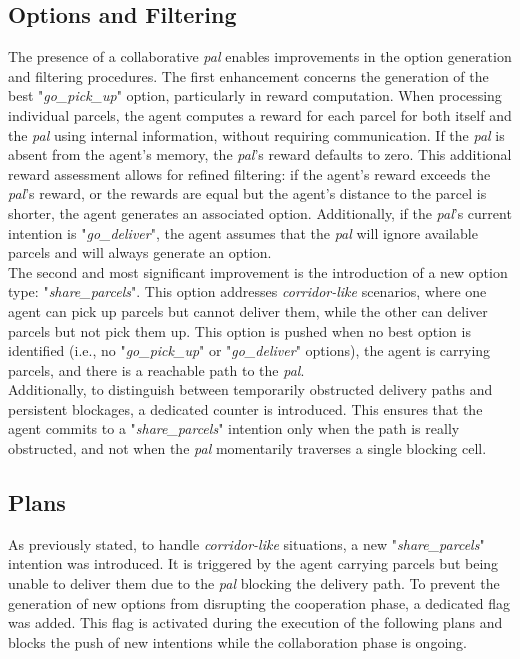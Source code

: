     \subsection{Options and Filtering}
        The presence of a collaborative \textit{pal} enables improvements in the option generation and filtering procedures. The first enhancement concerns the generation of the best "\textit{go\_pick\_up}" option, particularly in reward computation. When processing individual parcels, the agent computes a reward for each parcel for both itself and the \textit{pal} using internal information, without requiring communication. If the \textit{pal} is absent from the agent's memory, the \textit{pal}'s reward defaults to zero. This additional reward assessment allows for refined filtering: if the agent's reward exceeds the \textit{pal}'s reward, or the rewards are equal but the agent's distance to the parcel is shorter, the agent generates an associated option. Additionally, if the \textit{pal}'s current intention is "\textit{go\_deliver}", the agent assumes that the \textit{pal} will ignore available parcels and will always generate an option.
        \medskip\\
        The second and most significant improvement is the introduction of a new option type: "\textit{share\_parcels}". This option addresses \textit{corridor-like} scenarios, where one agent can pick up parcels but cannot deliver them, while the other can deliver parcels but not pick them up. This option is pushed when no best option is identified (i.e., no "\textit{go\_pick\_up}" or "\textit{go\_deliver}" options), the agent is carrying parcels, and there is a reachable path to the \textit{pal}. 
        \medskip\\
        Additionally, to distinguish between temporarily obstructed delivery paths and persistent blockages, a dedicated counter is introduced. This ensures that the agent commits to a "\textit{share\_parcels}" intention only when the path is really obstructed, and not when the \textit{pal} momentarily traverses a single blocking cell.
    
    \subsection{Plans}\label{shareRequest}
        As previously stated, to handle \textit{corridor-like} situations, a new "\textit{share\_parcels}" intention was introduced. It is triggered by the agent carrying parcels but being unable to deliver them due to the \textit{pal} blocking the delivery path. To prevent the generation of new options from disrupting the cooperation phase, a dedicated flag was added. This flag is activated during the execution of the following plans and blocks the push of new intentions while the collaboration phase is ongoing.


